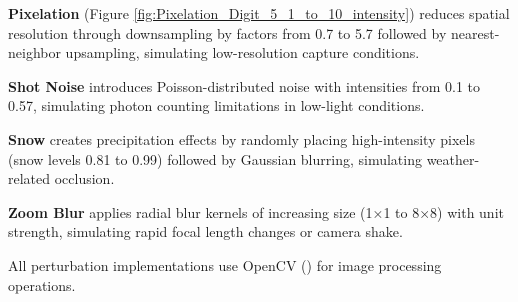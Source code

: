 \textbf{Pixelation} (Figure \ref{fig:Pixelation_Digit_5_1_to_10_intensity}) reduces spatial resolution through downsampling by factors from 0.7 to 5.7 followed by nearest-neighbor upsampling, simulating low-resolution capture conditions.

\textbf{Shot Noise} introduces Poisson-distributed noise with intensities from 0.1 to 0.57, simulating photon counting limitations in low-light conditions.

\textbf{Snow} creates precipitation effects by randomly placing high-intensity pixels (snow levels 0.81 to 0.99) followed by Gaussian blurring, simulating weather-related occlusion.

\textbf{Zoom Blur} applies radial blur kernels of increasing size (1×1 to 8×8) with unit strength, simulating rapid focal length changes or camera shake.

All perturbation implementations use OpenCV (\cite{opencv}) for image processing operations.






